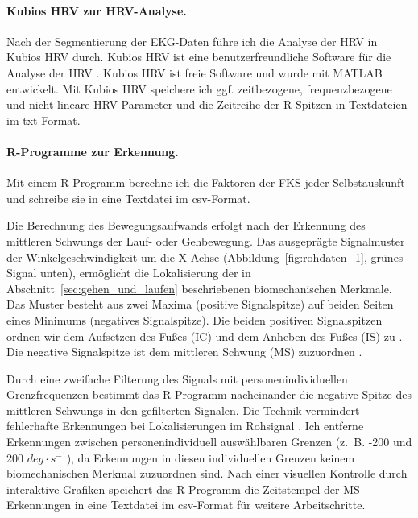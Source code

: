 \paragraph{Kubios \ac{HRV} zur \ac{HRV}-Analyse.} 

\label{par:kubios_hrv_zur_hrv_analyse}

Nach der Segmentierung der \ac{EKG}-Daten führe ich die Analyse der \ac{HRV} in Kubios \ac{HRV} durch. Kubios \ac{HRV} ist eine benutzerfreundliche Software für die Analyse der \ac{HRV} \citep{Tarvainen2014}. Kubios \ac{HRV} ist freie Software und wurde mit MATLAB entwickelt. Mit Kubios \ac{HRV} speichere ich ggf. zeitbezogene, frequenzbezogene und nicht lineare \ac{HRV}-Parameter und die Zeitreihe der R-Spitzen in Textdateien im txt-Format.

\paragraph{R-Programme zur Erkennung.} 

\label{par:r_programme_zur_erkennung}

Mit einem R-Programm berechne ich die Faktoren der \ac{FKS} jeder Selbstauskunft und schreibe sie in eine Textdatei im \acs{csv}-Format.

Die Berechnung des Bewegungsaufwands erfolgt nach der Erkennung des mittleren Schwungs der Lauf- oder Gehbewegung. Das ausgeprägte Signalmuster der Winkelgeschwindigkeit um die X-Achse (Abbildung~\ref{fig:rohdaten_1}, grünes Signal unten), ermöglicht die Lokalisierung der in Abschnitt~\ref{sec:gehen_und_laufen} beschriebenen biomechanischen Merkmale. Das Muster besteht aus zwei Maxima (positive Signalspitze) auf beiden Seiten eines Minimums (negatives Signalspitze). Die beiden positiven Signalspitzen ordnen wir dem Aufsetzen des Fußes (\ac{IC}) und dem Anheben des Fußes (\ac{IS}) zu \citep{Aminian2002}. Die negative Signalspitze ist dem mittleren Schwung (\ac{MS}) zuzuordnen \citep{Aminian2002}.

Durch eine zweifache Filterung des Signals mit personenindividuellen Grenzfrequenzen bestimmt das R-Programm nacheinander die negative Spitze des mittleren Schwungs in den gefilterten Signalen. Die Technik vermindert fehlerhafte Erkennungen bei Lokalisierungen im Rohsignal \citep{Lee2011}. Ich entferne Erkennungen zwischen personenindividuell auswählbaren Grenzen (z.~B. -200 und 200 $deg \cdot s^{-1}$), da Erkennungen in diesen individuellen Grenzen keinem biomechanischen Merkmal zuzuordnen sind. Nach einer visuellen Kontrolle durch interaktive Grafiken speichert das R-Programm die Zeitstempel der \ac{MS}-Erkennungen in eine Textdatei im \acs{csv}-Format für weitere Arbeitschritte.

